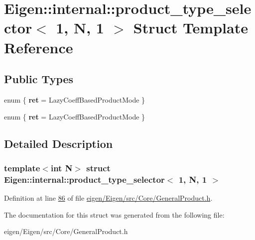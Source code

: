 \hypertarget{struct_eigen_1_1internal_1_1product__type__selector_3_011_00_01_n_00_011_01_4}{}\section{Eigen\+:\+:internal\+:\+:product\+\_\+type\+\_\+selector$<$ 1, N, 1 $>$ Struct Template Reference}
\label{struct_eigen_1_1internal_1_1product__type__selector_3_011_00_01_n_00_011_01_4}
\subsection*{Public Types}
\begin{DoxyCompactItemize}
\item 
\mbox{\label{struct_eigen_1_1internal_1_1product__type__selector_3_011_00_01_n_00_011_01_4_ae9e7d54710b0c8fb8e80d3f07a3ed560}} 
enum \{ {\bfseries ret} = Lazy\+Coeff\+Based\+Product\+Mode
 \}
\item 
\mbox{\label{struct_eigen_1_1internal_1_1product__type__selector_3_011_00_01_n_00_011_01_4_a2ed16a5700b6e58971843983661f1d65}} 
enum \{ {\bfseries ret} = Lazy\+Coeff\+Based\+Product\+Mode
 \}
\end{DoxyCompactItemize}


\subsection{Detailed Description}
\subsubsection*{template$<$int N$>$\newline
struct Eigen\+::internal\+::product\+\_\+type\+\_\+selector$<$ 1, N, 1 $>$}



Definition at line \hyperlink{eigen_2_eigen_2src_2_core_2_general_product_8h_source_l00086}{86} of file \hyperlink{eigen_2_eigen_2src_2_core_2_general_product_8h_source}{eigen/\+Eigen/src/\+Core/\+General\+Product.\+h}.



The documentation for this struct was generated from the following file\+:\begin{DoxyCompactItemize}
\item 
eigen/\+Eigen/src/\+Core/\+General\+Product.\+h\end{DoxyCompactItemize}
